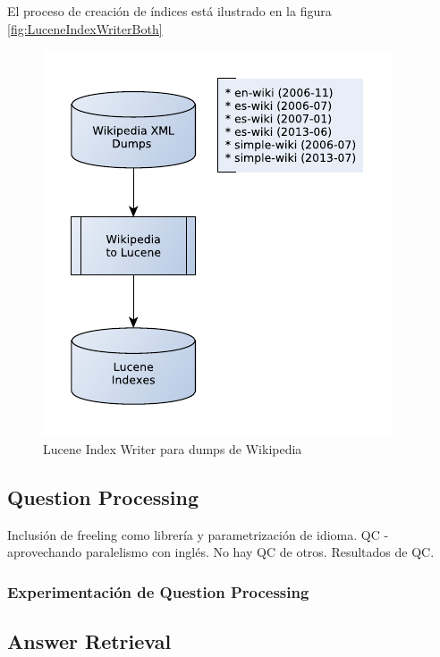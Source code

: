 El proceso de creación de índices está ilustrado en la figura \ref{fig:LuceneIndexWriterBoth}



\begin{figure}[H]
  \centering
    \includegraphics{graficos/LuceneIndexWriterWiki}
  \caption{Lucene Index Writer para dumps de Wikipedia}
  \label{fig:LuceneIndexWriterWiki}
\end{figure}


\subsection{Question Processing}
Inclusión de freeling como librería y parametrización de idioma.
QC -aprovechando paralelismo con inglés. No hay QC de otros.
Resultados de QC.
\subsubsection{Experimentación de Question Processing}
\subsection{Answer Retrieval}
